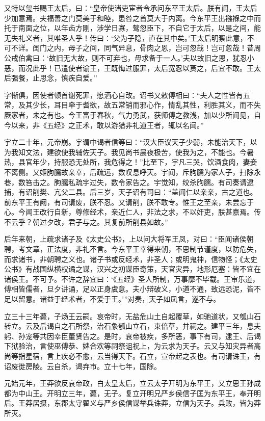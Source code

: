 \documentclass[]{article}
\begin{document}
又特以玺书赐王太后，曰：``皇帝使诸吏宦者令承问东平王太后。朕有闻，王太后少加意焉。夫福善之门莫美于和睦，患咎之首莫大于内离。今东平王出襁褓之中而托于南面之位，以年齿方刚，涉学日寡，骜忽臣下，不自它于太后，以是之间，能无失礼义者，其唯圣人乎！传曰：`父为子隐，直在其中矣。'王太后明察此意，不可不详。闺门之内，母子之间，同气异息，骨肉之恩，岂可忽哉！岂可忽哉！昔周公戒伯禽曰：`故旧无大故，则不可弃也，毋求备于一人。'夫以故旧之恩，犹忍小恶，而况此乎！已遣使者谕王，王既悔过服罪，太后宽忍以贳之，后宜不敢。王太后强餐，止思念，慎疾自爱。''

字惭俱，因使者顿首谢死罪，愿洒心自改。诏书又敕傅相曰：``夫人之性皆有五常，及其少长，耳目牵于耆欲，故五常销而邪心作，情乱其性，利胜其义，而不失厥家者，未之有也。今王富于春秋，气力勇武，获师傅之教浅，加以少所闻见，自今以来，非《五经》之正术，敢以游猎非礼道王者，辄以名闻。''

宇立二十年，元帝崩。宇谓中谒者信等曰：``汉大臣议天子少弱，未能治天下，以为我知文法，建欲使我辅佐天子。我见尚书晨夜极苦，使我为之，不能也。今暑热，县官年少，持服恐无处所，我危得之！''比至下，宇凡三哭，饮酒食肉，妻妾不离侧。又姬朐臑故亲幸，后疏远，数叹息呼天。宇闻，斥朐臑为家人子，扫除永巷，数笞击之。朐臑私疏宇过失，数令家告之。宇觉知，绞杀朐臑。有司奏请逮捕，有诏削樊、亢父二县。后三岁，天子诏有司曰：``盖闻仁以亲亲，古之道也。前东平王有阙，有司请废，朕不忍。又请削，朕不敢专。惟王之至亲，未尝忘于心。今闻王改行自新，尊修经术，亲近仁人，非法之求，不以奸吏，朕甚嘉焉。传不云乎？朝过夕改，君子与之。其复前所削县如故。''

后年来朝，上疏求诸子及《太史公书》，上以问大将军王凤，对曰：``臣闻诸侯朝聘，考文章，正法度，非礼不言。今东平王幸得来朝，不思制节谨度，以防危失，而求诸书，非朝聘之义也。诸子书或反经术，非圣人；或明鬼神，信物怪；《太史公书》有战国纵横权谲之谋，汉兴之初谋臣奇策，天官灾异，地形厄塞：皆不宜在诸侯王。不可予。不许之辞宜曰：`《五经》圣人所制，万事靡不毕载。王审乐道，傅相皆儒者，旦夕讲诵，足以正身虞意。夫小辩破义，小道不通，致远恐泥，皆不足以留意。诸益于经术者，不爱于王。'''对奏，天子如凤言，遂不与。

立三十三年薨，子炀王云嗣。哀帝时，无盐危山土自起覆草，如驰道状，又瓠山石转立。云及后谒自之石所祭，治石象瓠山立石，束倍草，并祠之。建平三年，息夫躬、孙宠等共因幸臣董贤告之。是时，哀帝被疾，多所恶，事下有司，逮王、后谒下狱验治，言使巫傅恭、婢合欢等祠祭诅祝上，为云求为天子。云又与知灾异者高尚等指星宿，言上疾必不愈，云当得天下。石立，宣帝起之表也。有司请诛王，有诏废徙房陵。云自杀，谒弃市。立十七年，国除。

元始元年，王莽欲反哀帝政，白太皇太后，立云太子开明为东平王，又立思王孙成都为中山王。开明立三年，薨，无子。复立开明兄严乡侯信子匡为东平王，奉开明后。王莽居摄，东郡太守翟义与严乡侯信谋举兵诛莽，立信为天子。兵败，皆为莽所灭。
\end{document}
